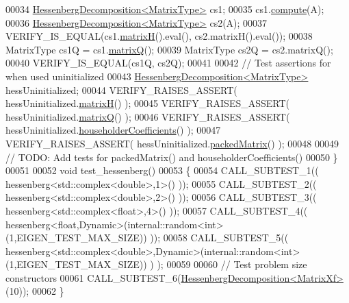 \begin{DoxyCode}
00034   \hyperlink{group___eigenvalues___module}{HessenbergDecomposition<MatrixType>} cs1;
00035   cs1.\hyperlink{group___eigenvalues___module_a239a6fd42c57aab3c0b048c47fde3004}{compute}(A);
00036   \hyperlink{group___eigenvalues___module}{HessenbergDecomposition<MatrixType>} cs2(A);
00037   VERIFY\_IS\_EQUAL(cs1.\hyperlink{group___eigenvalues___module_a8e781d2e22a2304647bcf0ae913cc8ea}{matrixH}().eval(), cs2.matrixH().eval());
00038   MatrixType cs1Q = cs1.\hyperlink{group___eigenvalues___module_a346441e4902a58d43d698ac3da6ff791}{matrixQ}();
00039   MatrixType cs2Q = cs2.matrixQ();  
00040   VERIFY\_IS\_EQUAL(cs1Q, cs2Q);
00041 
00042   \textcolor{comment}{// Test assertions for when used uninitialized}
00043   \hyperlink{group___eigenvalues___module}{HessenbergDecomposition<MatrixType>} hessUninitialized;
00044   VERIFY\_RAISES\_ASSERT( hessUninitialized.\hyperlink{group___eigenvalues___module_a8e781d2e22a2304647bcf0ae913cc8ea}{matrixH}() );
00045   VERIFY\_RAISES\_ASSERT( hessUninitialized.\hyperlink{group___eigenvalues___module_a346441e4902a58d43d698ac3da6ff791}{matrixQ}() );
00046   VERIFY\_RAISES\_ASSERT( hessUninitialized.\hyperlink{group___eigenvalues___module_a65fa81ce79d956baa59a30a6d82f8a84}{householderCoefficients}() );
00047   VERIFY\_RAISES\_ASSERT( hessUninitialized.\hyperlink{group___eigenvalues___module_a1f72b7612fd4edc5a6f31005e433e1dd}{packedMatrix}() );
00048 
00049   \textcolor{comment}{// TODO: Add tests for packedMatrix() and householderCoefficients()}
00050 \}
00051 
00052 \textcolor{keywordtype}{void} test\_hessenberg()
00053 \{
00054   CALL\_SUBTEST\_1(( hessenberg<std::complex<double>,1>() ));
00055   CALL\_SUBTEST\_2(( hessenberg<std::complex<double>,2>() ));
00056   CALL\_SUBTEST\_3(( hessenberg<std::complex<float>,4>() ));
00057   CALL\_SUBTEST\_4(( hessenberg<float,Dynamic>(internal::random<int>(1,EIGEN\_TEST\_MAX\_SIZE)) ));
00058   CALL\_SUBTEST\_5(( hessenberg<std::complex<double>,Dynamic>(internal::random<int>(1,EIGEN\_TEST\_MAX\_SIZE)) )
      );
00059 
00060   \textcolor{comment}{// Test problem size constructors}
00061   CALL\_SUBTEST\_6(\hyperlink{group___eigenvalues___module_class_eigen_1_1_hessenberg_decomposition}{HessenbergDecomposition<MatrixXf>}(10));
00062 \}
\end{DoxyCode}
